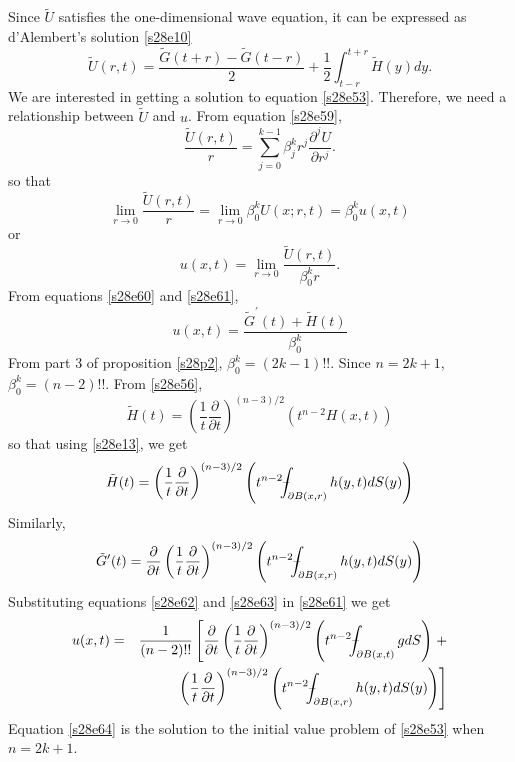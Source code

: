 \documentclass{article}
\newcommand{\fint}{\mbox{--}\mkern-16mu\int}
\theoremstyle{plain}
\numberwithin{thm}{section}
\theoremstyle{plain}
\numberwithin{prop}{section}
\theoremstyle{definition}
\numberwithin{defn}{section}
\theoremstyle{remark}
\numberwithin{equation}{section}
\begin{document}
Since $\tilde{U}$ satisfies the one-dimensional wave equation, it can be expressed as d'Alembert's solution
\eqref{s28e10} 
\begin{equation}\label{s28e60}
\tilde{U}(r,t) = \frac{\tilde{G}(t+r) - \tilde{G}(t-r)}{2} + \frac{1}{2}\int_{t-r}^{t+r}\tilde{H}(y)dy.
\end{equation}
We are interested in getting a solution to equation \eqref{s28e53}. Therefore, we need a relationship between
$\tilde{U}$ and $u$. From equation \eqref{s28e59},
\[
\frac{\tilde{U}(r,t)}{r} = \sum_{j=0}^{k-1}\beta^k_j r^{j}\frac{\partial^j U}{\partial r^j}.
\]
so that
\[
\lim_{r \rightarrow 0}\frac{\tilde{U}(r,t)}{r} = \lim_{r\rightarrow 0} \beta^k_0 U(x; r, t) = \beta^k_0 u(x,t)
\]
or
\begin{equation}\label{s28e61}
u(x,t) = \lim_{r \rightarrow 0} \frac{\tilde{U}(r,t)}{\beta^k_0 r}.
\end{equation}
From equations \eqref{s28e60} and \eqref{s28e61},
\[
u(x,t) = \frac{\tilde{G}^\prime(t) + \tilde{H}(t)}{\beta^k_0}
\]
From part 3 of proposition \ref{s28p2}, $\beta_0^k = (2k-1)!!$. Since $n = 2k+1$, $\beta_0^k = (n-2)!!$. From
\eqref{s28e56}, 
\[
\tilde{H}(t) = \left(\frac{1}{t}\frac{\partial}{\partial t}\right)^{(n-3)/2}(t^{n-2}H(x,t))
\]
so that using \eqref{s28e13}, we get
\begin{equation}\label{s28e62}
\tilde{H}(t) = \left(\frac{1}{t}\frac{\partial}{\partial t}\right)^{(n-3)/2}
\left(t^{n-2}\fint_{\partial B(x,r)}h(y, t)dS(y)\right)
\end{equation}
Similarly,
\begin{equation}\label{s28e63}
\tilde{G}^\prime(t) = \frac{\partial}{\partial t}\left(\frac{1}{t}\frac{\partial}{\partial t}\right)^{(n-3)/2}
\left(t^{n-2}\fint_{\partial B(x,r)}h(y, t)dS(y)\right)
\end{equation}
Substituting equations \eqref{s28e62} and \eqref{s28e63} in \eqref{s28e61} we get
\begin{eqnarray}
u(x,t) &=& \frac{1}{(n-2)!!}\left[\frac{\partial}{\partial t}\left(\frac{1}{t}\frac{\partial}{\partial t}
\right)^{(n-3)/2}\left(t^{n-2}\fint_{\partial B(x,t)}gdS\right)\right. + \nonumber \\
& & \left.\left(\frac{1}{t}\frac{\partial}{\partial t}\right)^{(n-3)/2}\left(t^{n-2}
\fint_{\partial B(x,r)}h(y, t)dS(y)\right)\right] \label{s28e64}
\end{eqnarray}
Equation \eqref{s28e64} is the solution to the initial value problem of \eqref{s28e53} when $n=2k+1$.
\end{document}
